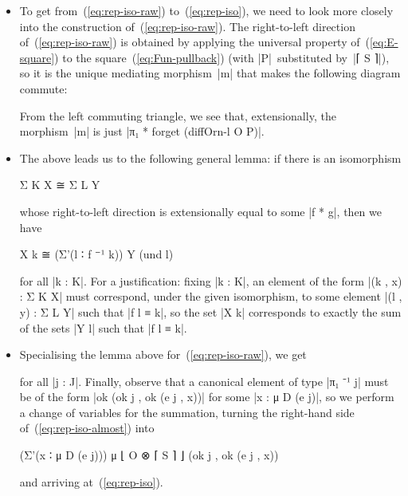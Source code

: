\begin{itemize}
\item To get from~(\ref{eq:rep-iso-raw}) to~(\ref{eq:rep-iso}), we need to look more closely into the construction of~(\ref{eq:rep-iso-raw}).
The right-to-left direction of~(\ref{eq:rep-iso-raw}) is obtained by applying the universal property of~(\ref{eq:E-square}) to the square~(\ref{eq:Fun-pullback}) (with |P|~substituted by~|⌈ S ⌉|), so it is the unique mediating morphism~|m| that makes the following diagram commute:
\begin{center}
\end{center}
From the left commuting triangle, we see that, extensionally, the morphism~|m| is just |π₁ * forget (diffOrn-l O P)|.

\item The above leads us to the following general lemma:
if there is an isomorphism
\begin{code}
Σ K X ≅ Σ L Y
\end{code}
whose right-to-left direction is extensionally equal to some |f * g|, then we have
\begin{code}
X k ≅ (Σ'(l ∶ f ⁻¹ k)) Y (und l)
\end{code}
for all |k : K|.
For a justification: fixing |k : K|, an element of the form |(k , x) : Σ K X| must correspond, under the given isomorphism, to some element |(l , y) : Σ L Y| such that |f l ≡ k|, so the set |X k| corresponds to exactly the sum of the sets |Y l| such that |f l ≡ k|.

\item Specialising the lemma above for~(\ref{eq:rep-iso-raw}), we get
for all |j : J|.
Finally, observe that a canonical element of type |π₁ ⁻¹ j| must be of the form |ok (ok j , ok (e j , x))| for some |x : μ D (e j)|, so we perform a change of variables for the summation, turning the right-hand side of~(\ref{eq:rep-iso-almost}) into
\begin{code}
(Σ'(x ∶ μ D (e j))) μ ⌊ O ⊗ ⌈ S ⌉ ⌋ (ok j , ok (e j , x))
\end{code}
and arriving at~(\ref{eq:rep-iso}).

\end{itemize}

